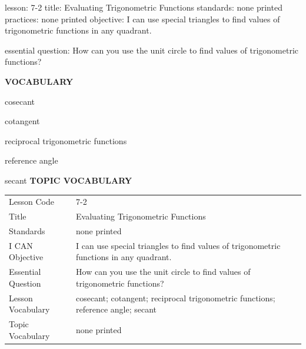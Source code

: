\documentclass{article}
\newenvironment{lesson-meta}{}{}        %
\newcommand{\te}[1]{}                   %
\begin{document}
\begin{lesson-meta}
lesson: 7-2
title: Evaluating Trigonometric Functions
standards: none printed
practices: none printed
objective: I can use special triangles to find values of trigonometric functions in any quadrant.

essential question: How can you use the unit circle to find values of trigonometric functions?

\textbf{VOCABULARY}
\item cosecant
\item cotangent
\item reciprocal trigonometric functions
\item reference angle
\item secant
\textbf{TOPIC VOCABULARY}
\te{No separate topic vocabulary list is printed on these pages.}
\begin{tabular}{ll}
Lesson Code & 7-2 \\
Title & Evaluating Trigonometric Functions \\
Standards & none printed \\
I CAN Objective & I can use special triangles to find values of trigonometric functions in any quadrant. \\
Essential Question & How can you use the unit circle to find values of trigonometric functions? \\
Lesson Vocabulary & cosecant; cotangent; reciprocal trigonometric functions; reference angle; secant \\
Topic Vocabulary & none printed \\
\end{tabular}
\end{lesson-meta}
\end{document}
